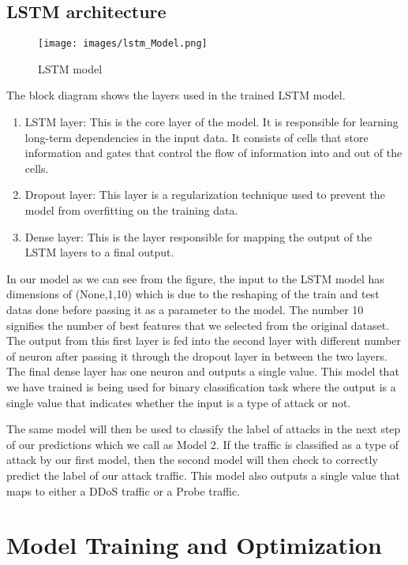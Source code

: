 \subsection{LSTM architecture}
\vspace{-18pt}
\begin{figure}[tbh]
	\begin{center}
		\texttt{[image: images/lstm\_Model.png]}
		\caption{LSTM model}
		\label{LSTM model}
	\end{center}
\end{figure}
\newpage
The block diagram shows the layers used in the trained LSTM model.
\begin{enumerate}[label=\roman*.]
	\item LSTM layer: This is the core layer of the model. It is responsible for learning long-term dependencies in the input data. It consists of cells that store information and gates that control the flow of information into and out of the cells.
	\item Dropout layer: This layer is a regularization technique used to prevent the model from overfitting on the training data.
	\item Dense layer: This is the layer responsible for mapping the output of the LSTM layers to a final output. 
\end{enumerate}
In our model as we can see from the figure, the input to the LSTM model has dimensions of (None,1,10) which is due to the reshaping of the train and test datas done before passing it as a parameter to the model. The number 10 signifies the number of best features that we selected from the original dataset. The output from this first layer is fed into the second layer with different number of neuron after passing it through the dropout layer in between the two layers. The final dense layer has one neuron and outputs a single value. This model that we have trained is being used for binary classification task where the output is a single value that indicates whether the input is a type of attack or not.\par 
The same model will then be used to classify the label of attacks in the next step of our predictions which we call as Model 2. If the traffic is classified as a type of attack by our first model, then the second model will then check to correctly predict the label of our attack traffic. This model also outputs a single value that maps to either a DDoS traffic or a Probe traffic.

\section{Model Training and Optimization}
\vspace{-18pt}
